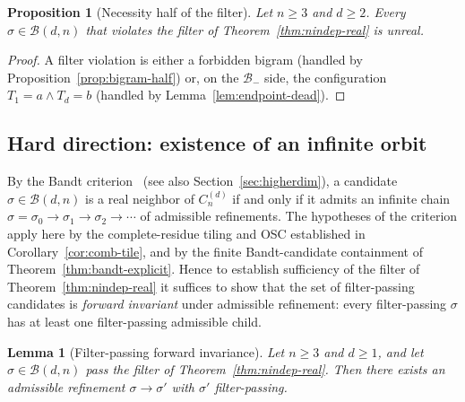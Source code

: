 \documentclass{amsart}
\newtheorem{proposition}[theorem]{Proposition}
\newtheorem{lemma}[theorem]{Lemma}
\theoremstyle{definition}
\theoremstyle{remark}
\begin{document}
\begin{proposition}[Necessity half of the filter]
\label{prop:necessity}
Let $n \ge 3$ and $d \ge 2$.  Every $\sigma \in \mathcal{B}(d, n)$
that violates the filter of Theorem~\ref{thm:nindep-real} is
unreal.
\end{proposition}

\begin{proof}
A filter violation is either a forbidden bigram (handled by
Proposition~\ref{prop:bigram-half}) or, on the $\mathcal{B}_-$
side, the configuration $T_1 = a \wedge T_d = b$ (handled by
Lemma~\ref{lem:endpoint-dead}).
\end{proof}

\subsection{Hard direction: existence of an infinite orbit}
\label{ssec:hard-direction}

By the Bandt criterion~\cite{bandt1991,lau-ngai}
\textup{(}see also Section~\ref{sec:higherdim}\textup{)}, a
candidate $\sigma \in \mathcal{B}(d, n)$ is a real neighbor of
$C_n^{(d)}$ if and only if it admits an infinite chain
$\sigma = \sigma_0 \to \sigma_1 \to \sigma_2 \to \cdots$ of
admissible refinements.  The hypotheses of the criterion apply
here by the complete-residue tiling and OSC established in
Corollary~\ref{cor:comb-tile}, and by the finite Bandt-candidate
containment of Theorem~\ref{thm:bandt-explicit}.  Hence to
establish sufficiency of the
filter of Theorem~\ref{thm:nindep-real} it suffices to show
that the set of filter-passing candidates is \emph{forward
invariant} under admissible refinement: every filter-passing
$\sigma$ has at least one filter-passing admissible child.

\begin{lemma}[Filter-passing forward invariance]
\label{lem:forward-invariance}
Let $n \ge 3$ and $d \ge 1$, and let $\sigma \in \mathcal{B}(d, n)$
pass the filter of Theorem~\ref{thm:nindep-real}.  Then there
exists an admissible refinement $\sigma \to \sigma'$ with $\sigma'$
filter-passing.
\end{lemma}
\end{document}
